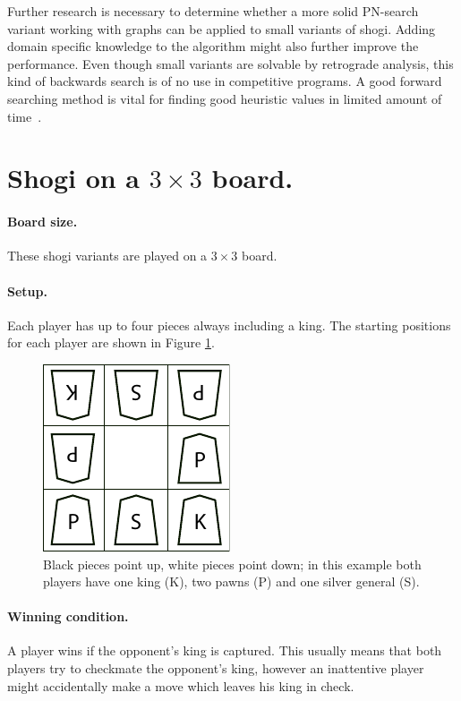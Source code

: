 \documentclass[a4paper, 11pt]{article}
\begin{document}
Further research is necessary to determine whether a more solid PN-search variant working with graphs can be applied to small variants of shogi.
Adding domain specific knowledge to the algorithm might also further improve the performance. Even though small variants are solvable by
retrograde analysis, this kind of backwards search is of no use in competitive programs. A good forward searching method is vital for
finding good heuristic values in limited amount of time~\cite{iida2002computer}.

{}


\newpage
{\appendix
\section{Shogi on a $3 \times 3$ board.}
\label{3x3rules}
\paragraph{Board size.} These shogi variants are played on a $3 \times 3$ board.

\paragraph{Setup.} Each player has up to four pieces always including a king. The starting positions for each player are shown in
Figure \ref{startingpos}.
\begin{figure}[h]
\center
\includegraphics{smallsetup.pdf}
\caption{Black pieces point up, white pieces point down; in this example both players have one king (K), two pawns (P) and one silver general (S).}
\label{startingpos}
\end{figure}

\paragraph{Winning condition.} A player wins if the opponent's king is captured. This usually means that both players try to checkmate the opponent's king, however an
inattentive player might accidentally make a move which leaves his king in check.

}
\end{document}
